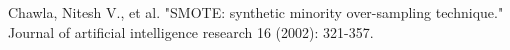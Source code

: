 \documentclass[10pt,journal,compsoc]{IEEEtran}
\begin{document}
\ifCLASSOPTIONcaptionsoff
  \newpage
\fi





%
%
%
\begin{thebibliography}{10}

Chawla, Nitesh V., et al. "SMOTE: synthetic minority over-sampling technique." Journal of artificial intelligence research 16 (2002): 321-357.









\end{thebibliography}



% 
\end{document}
